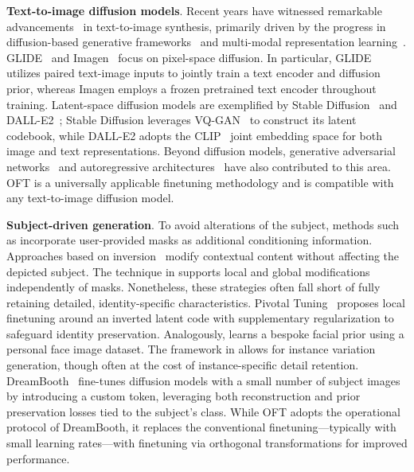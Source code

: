 \textbf{Text-to-image diffusion models}. Recent years have witnessed remarkable advancements~\cite{saharia2022photorealistic,ramesh2022hierarchical,rombach2022high,gu2022vector,nichol2022glide} in text-to-image synthesis, primarily driven by the progress in diffusion-based generative frameworks~\cite{ho2020denoising,song2021score,song2021denoising,dhariwal2021diffusion} and multi-modal representation learning~\cite{su2020vlbert,lu2019vilbert,radford2021learning,wang2021simvlm,li2022blip,li2023blip,alayrac2022flamingo,schuhmann2022laion}. GLIDE~\cite{nichol2022glide} and Imagen~\cite{saharia2022photorealistic} focus on pixel-space diffusion. In particular, GLIDE utilizes paired text-image inputs to jointly train a text encoder and diffusion prior, whereas Imagen employs a frozen pretrained text encoder throughout training. Latent-space diffusion models are exemplified by Stable Diffusion~\cite{rombach2022high} and DALL-E2~\cite{ramesh2022hierarchical}; Stable Diffusion leverages VQ-GAN~\cite{esser2021taming} to construct its latent codebook, while DALL-E2 adopts the CLIP~\cite{radford2021learning} joint embedding space for both image and text representations. Beyond diffusion models, generative adversarial networks~\cite{reed2016generative,zhang2017stackgan,xu2018attngan,li2019controllable} and autoregressive architectures~\cite{ramesh2021zero,ding2021cogview,wu2022nuwa,yuscaling} have also contributed to this area. OFT is a universally applicable finetuning methodology and is compatible with any text-to-image diffusion model.

\textbf{Subject-driven generation}. To avoid alterations of the subject, methods such as \cite{avrahami2022blended,nichol2022glide} incorporate user-provided masks as additional conditioning information. Approaches based on inversion~\cite{choi2021ilvr,dhariwal2021diffusion,ramesh2022hierarchical,gal2022image} modify contextual content without affecting the depicted subject. The technique in \cite{hertz2022prompt} supports local and global modifications independently of masks. Nonetheless, these strategies often fall short of fully retaining detailed, identity-specific characteristics. Pivotal Tuning~\cite{roich2022pivotal} proposes local finetuning around an inverted latent code with supplementary regularization to safeguard identity preservation. Analogously, \cite{nitzan2022mystyle} learns a bespoke facial prior using a personal face image dataset. The framework in \cite{casanova2021instance} allows for instance variation generation, though often at the cost of instance-specific detail retention. DreamBooth~\cite{ruiz2023dreambooth} fine-tunes diffusion models with a small number of subject images by introducing a custom token, leveraging both reconstruction and prior preservation losses tied to the subject’s class. While OFT adopts the operational protocol of DreamBooth, it replaces the conventional finetuning—typically with small learning rates—with finetuning via orthogonal transformations for improved performance.

